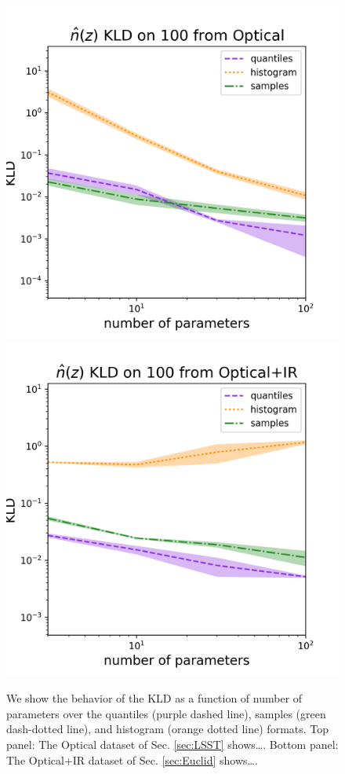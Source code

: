 \documentclass[\docopts]{\docclass}
\begin{document}
\begin{figure}
  \includegraphics[width=0.9\columnwidth]{figures/lsst_kld.png}\\
  \includegraphics[width=0.9\columnwidth]{figures/euclid_kld.png}
  \caption{We show the behavior of the KLD as a function of number of 
parameters over the quantiles (purple dashed line), samples (green dash-dotted 
line), and histogram (orange dotted line) formats.  Top panel: The Optical 
dataset of Sec. \ref{sec:LSST} shows\dots.  Bottom panel: The Optical+IR 
dataset of Sec. \ref{sec:Euclid} shows\dots.
  \label{fig:kld}}
\end{figure}
\end{document}
